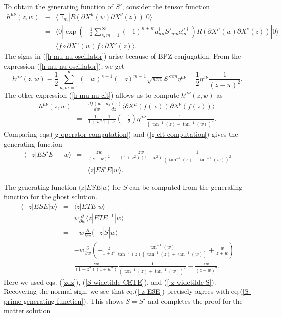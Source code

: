 \documentclass[a4paper,12pt]{article}
\begin{document}
To obtain the generating function of $S'$,
consider the tensor function
\begin{eqnarray}
h^{\mu\nu}(z,w) &\equiv&
\langle \Xi_m|R\left(\partial X^{\mu}(w)\partial X^{\nu}(z)\right)|0\rangle \nonumber \\
&=&\langle 0|\exp\left(-\frac{1}{2}\sum_{n,m=1}^{\infty}(-1)^{n+m}
a_{n\mu}^{\dagger} S'_{nm} a_{m}^{\mu\dagger}\right)
R\left(\partial X^{\mu}(w)\partial X^{\nu}(z)\right)| 0\rangle
\label{h-mu-nu-oscillator}\\
&=&\langle f\circ\partial X^{\mu}(w) f\circ\partial X^{\nu}(z)\rangle.
\label{h-mu-nu-cft}
\end{eqnarray}
The signs in (\ref{h-mu-nu-oscillator}) arise because of BPZ
conjugation. From the expression (\ref{h-mu-nu-oscillator}), we
get
\begin{equation} \label{g-operator-computation}
h^{\mu\nu}(z,w)=
\frac{1}{2}\sum_{n,m=1}^{\infty}(-w)^{n-1}(-z)^{m-1}\sqrt{nm}
S'^{nm}\eta^{\mu\nu}
-\frac{1}{2}\eta^{\mu\nu}\frac{1}{(z-w)^2}.
\end{equation}
The other expression (\ref{h-mu-nu-cft}) allows us
to compute $h^{\mu\nu}(z,w)$ as
\begin{eqnarray} \label{g-cft-computation}
h^{\mu\nu}(z,w) &=&\frac{df(w)}{dw}\frac{df(z)}{dz}
\langle \partial X^{\mu}(f(w))\partial X^{\nu}(f(z))\rangle  \nonumber \\
&=&
\frac{1}{1+w^2}\frac{1}{1+z^2}\left(-\frac{1}{2}\right)\eta^{\mu\nu}
\frac{1}{(\tan^{-1}(z)-\tan^{-1}(w))^2}.
\end{eqnarray}
Comparing eqs.(\ref{g-operator-computation}) and (\ref{g-cft-computation}) gives the
generating function
\begin{eqnarray}\label{S-prime-generating-function}
\langle -z|ES'E|-w\rangle&=&\frac{zw}{(z-w)^2}-
\frac{zw}{(1+z^2)(1+w^2)}\frac{1}{(\tan^{-1}(z)-\tan^{-1}(w))^2}\nonumber\\
&=&\langle z|ES'E|w\rangle.
\end{eqnarray}

The generating function $\langle z|ESE|w\rangle$ for $S$ can be
computed from the generating function for the ghost solution.
\begin{eqnarray}
\langle -z|ESE|w \rangle &=&
\langle z|ETE|w \rangle \nonumber\\
&=&
w\frac{\partial}{\partial w}\langle z|ETE^{-1}|w \rangle\nonumber\\
&=&
-w\frac{\partial}{\partial w}\langle -z|\widetilde{S}|w \rangle\nonumber\\
&=&
-w\frac{\partial}{\partial w}\left(
-\frac{z}{1+z^2}\frac{\tan^{-1}(w)}{\tan^{-1}(z)(\tan^{-1}(z)+\tan^{-1}(w))}+\frac{w}{z+w}
\right)\nonumber\\
&=&\frac{zw}{(1+z^2)(1+w^2)}\frac{1}{(\tan^{-1}(z)+\tan^{-1}(w))^2}
-\frac{zw}{(z+w)^2}.\label{-z-ESE}
\end{eqnarray}
Here we used eqs. (\ref{zdz}), (\ref{S-widetilde-CETE}), and (\ref{-z-widetilde-S}).
Recovering the normal sign, we see that eq.(\ref{-z-ESE}) precisely agrees with
eq.(\ref{S-prime-generating-function}).
This shows $S=S'$ and completes the proof for the matter solution.
\end{document}
